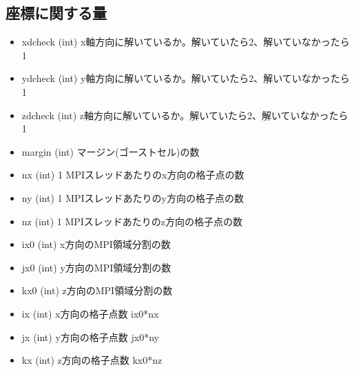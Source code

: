 \documentclass[letterpaper,10pt,dvipdfmx,report]{sphinxmanual}
\begin{document}
\subsection{座標に関する量}
\label{\detokenize{notation:id2}}\begin{itemize}
\item {} 
\sphinxAtStartPar
xdcheck (int) \sphinxhyphen{}\sphinxhyphen{} x軸方向に解いているか。解いていたら2、解いていなかったら1

\item {} 
\sphinxAtStartPar
ydcheck (int) \sphinxhyphen{}\sphinxhyphen{} y軸方向に解いているか。解いていたら2、解いていなかったら1

\item {} 
\sphinxAtStartPar
zdcheck (int) \sphinxhyphen{}\sphinxhyphen{} z軸方向に解いているか。解いていたら2、解いていなかったら1

\item {} 
\sphinxAtStartPar
margin (int) \sphinxhyphen{}\sphinxhyphen{} マージン(ゴーストセル)の数

\item {} 
\sphinxAtStartPar
nx (int) \sphinxhyphen{}\sphinxhyphen{} 1 MPIスレッドあたりのx方向の格子点の数

\item {} 
\sphinxAtStartPar
ny (int) \sphinxhyphen{}\sphinxhyphen{} 1 MPIスレッドあたりのy方向の格子点の数

\item {} 
\sphinxAtStartPar
nz (int) \sphinxhyphen{}\sphinxhyphen{} 1 MPIスレッドあたりのz方向の格子点の数

\item {} 
\sphinxAtStartPar
ix0 (int) \sphinxhyphen{}\sphinxhyphen{} x方向のMPI領域分割の数

\item {} 
\sphinxAtStartPar
jx0 (int) \sphinxhyphen{}\sphinxhyphen{} y方向のMPI領域分割の数

\item {} 
\sphinxAtStartPar
kx0 (int) \sphinxhyphen{}\sphinxhyphen{} z方向のMPI領域分割の数

\item {} 
\sphinxAtStartPar
ix (int) \sphinxhyphen{}\sphinxhyphen{} x方向の格子点数 ix0*nx

\item {} 
\sphinxAtStartPar
jx (int) \sphinxhyphen{}\sphinxhyphen{} y方向の格子点数 jx0*ny

\item {} 
\sphinxAtStartPar
kx (int) \sphinxhyphen{}\sphinxhyphen{} z方向の格子点数 kx0*nz


\end{itemize}
\end{document}
